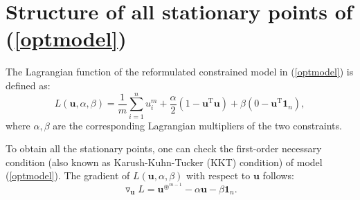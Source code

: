   

 
 

 \section{Structure  of  all  stationary points of  (\ref{optmodel})}\label{station}
The Lagrangian function  of the  reformulated  constrained  model in  (\ref{optmodel})    is 
defined as:
\begin{equation}\label{Lagrangianfunctionnew}
L(\mathbf u, \alpha, \beta)=
\frac{1}{m}
\sum\limits_{i=1}^{n}  u_{i}^{m}						%
+
\frac{\alpha}{2}
(1- \mathbf   u^{\mathrm T}   \mathbf   u  )
+
\beta (0- \mathbf   u^{\mathrm T}   \mathbf   1_{n}),
\end{equation}
where $ \alpha,\beta$ are  the  corresponding   Lagrangian   multipliers of  the two  constraints.

To  obtain all the stationary points, one can  check  the first-order  necessary   condition
(also known as Karush-Kuhn-Tucker (KKT) condition)
of model  (\ref{optmodel}).
The gradient of
$  L(\mathbf u, \alpha, \beta) $    with  respect  to  
$ \mathbf u $   follows: 
\begin{equation}\label{gradient}
\triangledown_{\mathbf u}L =
\mathbf u ^{\circledast^{m-1}}
-
\alpha \mathbf u-\beta \mathbf  1_{n} . 
\end{equation}



